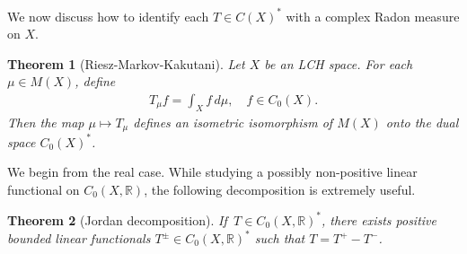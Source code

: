 \documentclass{article}
\numberwithin{equation}{section}
\newcommand{\bbR}{\mathbb{R}}
\theoremstyle{plain}
\newtheorem{theorem}{Theorem}[section]
\theoremstyle{definition}
\begin{document}
We now discuss how to identify each $T\in C(X)^*$ with a complex Radon measure on $X$.

\begin{theorem}[Riesz-Markov-Kakutani]\label{rmk}
	Let $X$ be an LCH space. For each $\mu\in M(X)$, define
	\begin{align*}
		T_\mu f=\int_X f\,d\mu,\quad f\in C_0(X).
	\end{align*}
	Then the map $\mu\mapsto T_\mu$ defines an isometric isomorphism of $M(X)$ onto the dual space $C_0(X)^*$.
\end{theorem}

We begin from the real case. While studying a possibly non-positive linear functional on $C_0(X,\bbR)$, the following decomposition is extremely useful.

\begin{theorem}[Jordan decomposition]
	If $\,T\in C_0(X,\bbR)^*$, there exists positive bounded linear functionals $T^\pm\in C_0(X,\bbR)^*$ such that $T=T^+-T^-$.
\end{theorem}
\end{document}
